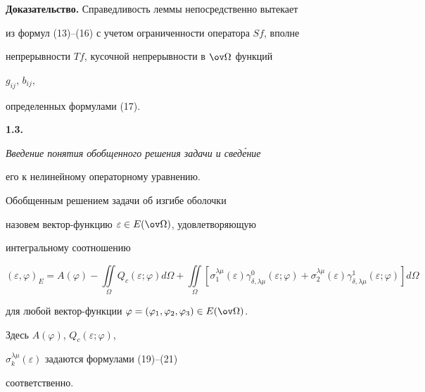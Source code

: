  


{\bf Доказательство.} Справедливость леммы непосредственно вытекает 


из формул (13)--(16) с учетом ограниченности оператора $Sf$, вполне 


непрерывности $Tf$, кусочной непрерывности в $\ov\Omega$ функций 


$g_{ij}$, $b_{ij}$, 


определенных формулами (17). 


\medskip 





 


{\bf 1.3.} {\it Введение понятия обобщенного решения задачи и свед\'ение 


его к нелинейному операторному уравнению.} 





 


\begin{defnnonum} 


Обобщенным решением задачи об изгибе оболочки 


назовем вектор-функцию $\varepsilon\in E(\ov\Omega)$, удовлетворяющую 


интегральному соотношению 


\begin{equation} 


(\varepsilon,\varphi)_E=A(\varphi)-\iint\limits_\Omega 


Q_c(\varepsilon;\varphi)d\Omega+\iint\limits_\Omega 


[\sigma^{\lambda\mu}_1(\varepsilon) 


\gamma^0_{\delta,\lambda\mu}(\varepsilon;\varphi)+ 


\sigma^{\lambda\mu}_2(\varepsilon) 


\gamma^1_{\delta,\lambda\mu}(\varepsilon;\varphi)]d\Omega 


\end{equation} 


для любой вектор-функции $\varphi=(\varphi_1,\varphi_2,\varphi_3)\in 


E(\ov\Omega)$. 


Здесь $A(\varphi)$, $Q_c(\varepsilon;\varphi)$, 


$\sigma^{\lambda\mu}_k(\varepsilon)$ задаются формулами (19)--(21) 


соответственно. 


\end{defnnonum} 





